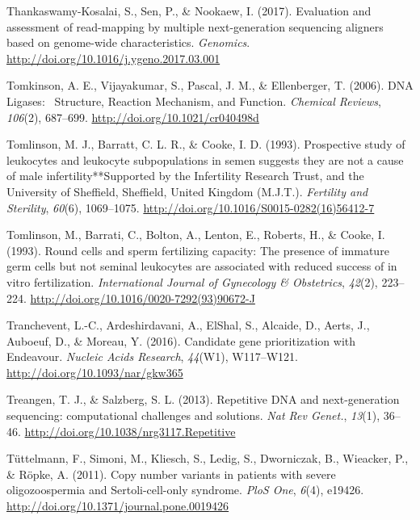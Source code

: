 \documentclass[12pt,twoside]{reedthesis}
\theoremstyle{definition}
\theoremstyle{definition}
\theoremstyle{remark}
\begin{document}
  \hypertarget{ref-Thankaswamy-Kosalai2017}{}
  Thankaswamy-Kosalai, S., Sen, P., \& Nookaew, I. (2017). Evaluation and
  assessment of read-mapping by multiple next-generation sequencing
  aligners based on genome-wide characteristics. \emph{Genomics}.
  \url{http://doi.org/10.1016/j.ygeno.2017.03.001}
  
  \hypertarget{ref-Tomkinson2006}{}
  Tomkinson, A. E., Vijayakumar, S., Pascal, J. M., \& Ellenberger, T.
  (2006). DNA Ligases:~ Structure, Reaction Mechanism, and Function.
  \emph{Chemical Reviews}, \emph{106}(2), 687--699.
  \url{http://doi.org/10.1021/cr040498d}
  
  \hypertarget{ref-Tomlinson1993}{}
  Tomlinson, M. J., Barratt, C. L. R., \& Cooke, I. D. (1993). Prospective
  study of leukocytes and leukocyte subpopulations in semen suggests they
  are not a cause of male infertility**Supported by the Infertility
  Research Trust, and the University of Sheffield, Sheffield, United
  Kingdom (M.J.T.). \emph{Fertility and Sterility}, \emph{60}(6),
  1069--1075. \url{http://doi.org/10.1016/S0015-0282(16)56412-7}
  
  \hypertarget{ref-Tomlinson1993a}{}
  Tomlinson, M., Barrati, C., Bolton, A., Lenton, E., Roberts, H., \&
  Cooke, I. (1993). Round cells and sperm fertilizing capacity: The
  presence of immature germ cells but not seminal leukocytes are
  associated with reduced success of in vitro fertilization.
  \emph{International Journal of Gynecology \& Obstetrics}, \emph{42}(2),
  223--224. \url{http://doi.org/10.1016/0020-7292(93)90672-J}
  
  \hypertarget{ref-Tranchevent2016}{}
  Tranchevent, L.-C., Ardeshirdavani, A., ElShal, S., Alcaide, D., Aerts,
  J., Auboeuf, D., \& Moreau, Y. (2016). Candidate gene prioritization
  with Endeavour. \emph{Nucleic Acids Research}, \emph{44}(W1),
  W117--W121. \url{http://doi.org/10.1093/nar/gkw365}
  
  \hypertarget{ref-Treangen2013}{}
  Treangen, T. J., \& Salzberg, S. L. (2013). Repetitive DNA and
  next-generation sequencing: computational challenges and solutions.
  \emph{Nat Rev Genet.}, \emph{13}(1), 36--46.
  \url{http://doi.org/10.1038/nrg3117.Repetitive}
  
  \hypertarget{ref-Tuttelmann2011}{}
  Tüttelmann, F., Simoni, M., Kliesch, S., Ledig, S., Dworniczak, B.,
  Wieacker, P., \& Röpke, A. (2011). Copy number variants in patients with
  severe oligozoospermia and Sertoli-cell-only syndrome. \emph{PloS One},
  \emph{6}(4), e19426. \url{http://doi.org/10.1371/journal.pone.0019426}
  
\end{document}
